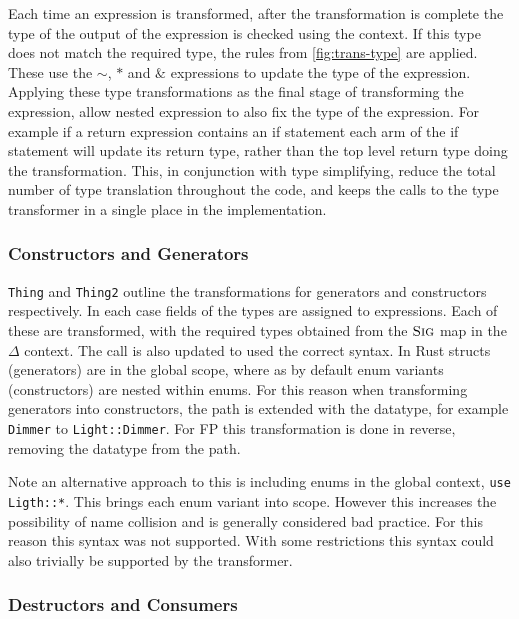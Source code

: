 \documentclass[ oneside,%
                    author={James Elgar},
                    degree={MEng},
                     title={Bidirectional transformer between functional and \\ object-oriented programming in Rust},
                  subtitle={}]{dissertation}
\newcommand{\rust}[1]{\texttt{#1}}
\begin{document}
Each time an expression is transformed, after the transformation is complete the type of the output of the expression is checked using the context. If this type does not match the required type, the rules from \autoref{fig:trans-type} are applied. These use the $\sim$, $*$ and $\&$ expressions to update the type of the expression. Applying these type transformations as the final stage of transforming the expression, allow nested expression to also fix the type of the expression. For example if a return expression contains an if statement each arm of the if statement will update its return type, rather than the top level return type doing the transformation. This, in conjunction with type simplifying, reduce the total number of type translation throughout the code, and keeps the calls to the type transformer in a single place in the implementation.


\subsubsection{Constructors and Generators}

\verb|Thing| and \verb|Thing2| outline the transformations for generators and constructors respectively. In each case fields of the types are assigned to expressions. Each of these are transformed, with the required types obtained from the $\textsc{Sig}$ map in the $\Delta$ context. The call is also updated to used the correct syntax. In Rust structs (generators) are in the global scope, where as by default enum variants (constructors) are nested within enums. For this reason when transforming generators into constructors, the path is extended with the datatype, for example \rust{Dimmer} to \rust{Light::Dimmer}. For FP this transformation is done in reverse, removing the datatype from the path.

Note an alternative approach to this is including enums in the global context, \rust{use Ligth::*}. This brings each enum variant into scope. However this increases the possibility of name collision and is generally considered bad practice. For this reason this syntax was not supported. With some restrictions this syntax could also trivially be supported by the transformer.

\subsubsection{Destructors and Consumers}
\end{document}
